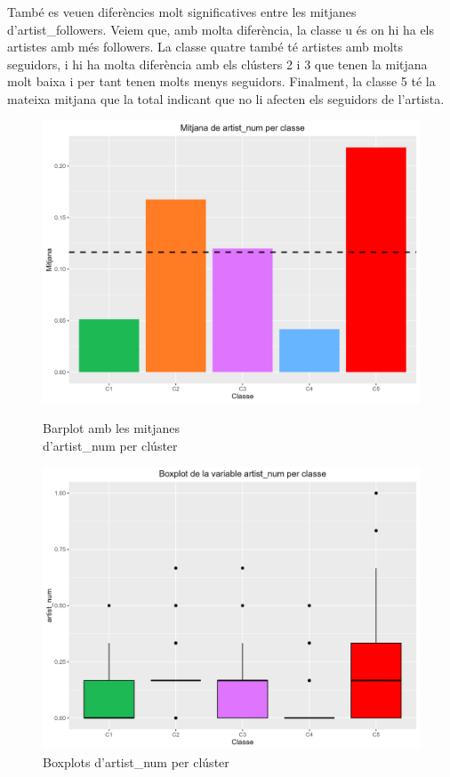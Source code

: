 \documentclass{article}
\begin{document}
També es veuen diferències molt significatives entre les mitjanes d'artist\_followers. Veiem que, amb molta diferència, la classe u és on hi ha els artistes amb més followers. La classe quatre també té artistes amb molts seguidors, i hi ha molta diferència amb els clústers 2 i 3 que tenen la mitjana molt baixa i per tant tenen molts menys seguidors. Finalment, la classe 5 té la mateixa mitjana que la total indicant que no li afecten els seguidors de l'artista. 

\begin{figure}[H]
\centering
    \begin{minipage}{.49\textwidth}
        \centering
        \includegraphics[width=0.95\linewidth]{Images/5_Profiling/numeriques/Num_BarPlot_artist_num.png}
        \caption{Barplot amb les mitjanes \\ d'artist\_num per clúster}
        \label{fig:Num_BarPlot_artist_num}
    \end{minipage}%
    \begin{minipage}{.49\textwidth}
        \centering
        \includegraphics[width=0.95\linewidth]{Images/5_Profiling/numeriques/Num_BoxPlot_artist_num.png}
        \caption{Boxplots d'artist\_num per clúster}
        \label{fig:Num_BoxPlot_artist_num}
    \end{minipage}%
\end{figure}
\end{document}
